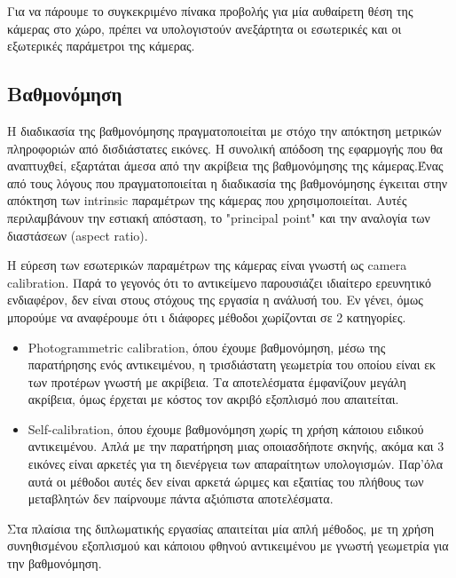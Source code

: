 Για να πάρουμε το συγκεκριμένο πίνακα προβολής για μία αυθαίρετη θέση της κάμερας στο χώρο, πρέπει να υπολογιστούν ανεξάρτητα οι εσωτερικές και οι εξωτερικές παράμετροι της κάμερας. 



\subsection{Βαθμονόμηση}



Η διαδικασία της βαθμονόμησης πραγματοποιείται με στόχο την απόκτηση μετρικών πληροφοριών από δισδιάστατες εικόνες. Η συνολική απόδοση της εφαρμογής που θα αναπτυχθεί, εξαρτάται άμεσα από την ακρίβεια της βαθμονόμησης της κάμερας.Ένας από τους λόγους που πραγματοποιείται η διαδικασία της βαθμονόμησης έγκειται στην απόκτηση των intrinsic παραμέτρων της κάμερας που χρησιμοποιείται. Αυτές περιλαμβάνουν την εστιακή απόσταση, το "principal point" και την αναλογία των διαστάσεων (aspect ratio). 


Η εύρεση των εσωτερικών παραμέτρων της κάμερας είναι γνωστή ως camera calibration. Παρά το γεγονός ότι το αντικείμενο παρουσιάζει ιδιαίτερο ερευνητικό ενδιαφέρον, δεν είναι στους στόχους της εργασία η ανάλυσή του. Εν γένει, όμως μπορούμε να αναφέρουμε ότι ι διάφορες μέθοδοι χωρίζονται σε 2 κατηγορίες.

\begin{itemize}
\item Photogrammetric calibration, όπου έχουμε βαθμονόμηση, μέσω της παρατήρησης ενός αντικειμένου, η τρισδιάστατη γεωμετρία του οποίου είναι εκ των προτέρων γνωστή με ακρίβεια. Τα αποτελέσματα έμφανίζουν μεγάλη ακρίβεια, όμως έρχεται με κόστος τον ακριβό εξοπλισμό που απαιτείται.
\item Self-calibration, όπου έχουμε βαθμονόμηση χωρίς τη χρήση κάποιου ειδικού αντικειμένου. Απλά με την παρατήρηση μιας οποιασδήποτε σκηνής, ακόμα και 3 εικόνες είναι αρκετές για τη διενέργεια των απαραίτητων υπολογισμών. Παρ'όλα
αυτά οι μέθοδοι αυτές δεν είναι αρκετά ώριμες και εξαιτίας του πλήθους των μεταβλητών δεν παίρνουμε πάντα αξιόπιστα αποτελέσματα.
\end{itemize}

Στα πλαίσια της διπλωματικής εργασίας απαιτείται μία απλή μέθοδος, με τη χρήση συνηθισμένου εξοπλισμού και κάποιου φθηνού αντικειμένου με γνωστή γεωμετρία για την βαθμονόμηση. 

